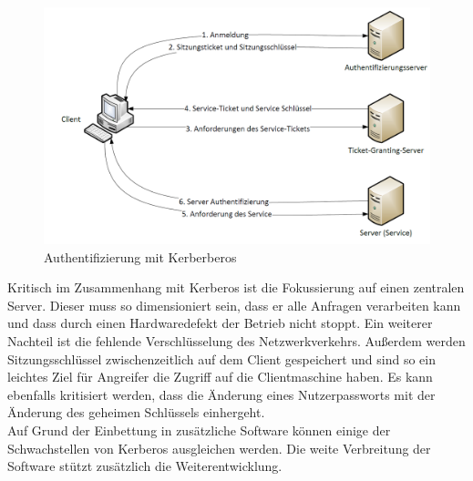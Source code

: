 \documentclass[
book,
a4paper,   
titlepage,  
halfparskip,
12pt        
]{scrartcl}
\begin{document}
\begin{onehalfspacing}
\begin{figure}[h]
	\centering
	\includegraphics[width=1\linewidth]{kerberos.png}
	\caption[Kerberos]{Authentifizierung mit Kerberberos \cite[vgl. S.140]{kerberos2}}
	\label{fig:kerb}
\end{figure}

Kritisch im Zusammenhang mit Kerberos ist die Fokussierung auf einen zentralen Server. Dieser muss so dimensioniert sein, dass er alle Anfragen verarbeiten kann und dass durch einen Hardwaredefekt der Betrieb nicht stoppt. Ein weiterer Nachteil ist die fehlende Verschlüsselung des Netzwerkverkehrs. Außerdem werden Sitzungsschlüssel zwischenzeitlich auf dem Client gespeichert und sind so ein leichtes Ziel für Angreifer die Zugriff auf die Clientmaschine haben. Es kann ebenfalls kritisiert werden, dass die Änderung eines Nutzerpassworts mit der Änderung des geheimen Schlüssels einhergeht.\\
Auf Grund der Einbettung in zusätzliche Software können einige der Schwachstellen von Kerberos ausgleichen werden. Die weite Verbreitung der Software \cite{datalabs} stützt zusätzlich die Weiterentwicklung.\cite[vgl. S.138f]{kerberos2}\cite{kerb3}


\end{onehalfspacing}
\end{document}
